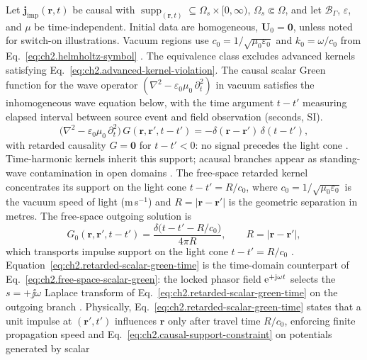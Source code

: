 Let $\mathbf{j}_{\mathrm{imp}}(\mathbf{r},t)$ be causal with
\(\operatorname{supp}_{(\mathbf{r},t)}\subseteq\Omega_s\times[0,\infty)\),
\(\Omega_s\Subset\Omega\), and let \(\mathcal{B}_\Gamma\), \(\varepsilon\), and
\(\mu\) be time-independent. Initial data are homogeneous,
\(\mathbf{U}_0=\mathbf{0}\), unless noted for switch-on illustrations. Vacuum
regions use \(c_0=1/\sqrt{\mu_0\varepsilon_0}\) and \(k_0=\omega/c_0\) from
Eq.~\eqref{eq:ch2.helmholtz-symbol} \cite{stratton1941}. The equivalence class
excludes advanced kernels satisfying Eq.~\eqref{eq:ch2.advanced-kernel-violation}.
The causal scalar Green function for the wave operator
\((\nabla^{2}-\varepsilon_0\mu_0\,\partial_t^{2})\) in vacuum satisfies the
inhomogeneous wave equation below, with the time argument \(t-t'\) measuring elapsed
interval between source event and field observation (seconds, SI).
\begin{equation}
\label{eq:ch2.retarded-scalar-wave-operator}
\Big(\nabla^{2}-\varepsilon_0\mu_0\,\partial_t^{2}\Big)\,
G(\mathbf{r},\mathbf{r}',t-t')
=
-\delta(\mathbf{r}-\mathbf{r}')\,\delta(t-t'),
\end{equation}
with retarded causality $G=\mathbf{0}$ for $t-t'<0$: no signal precedes the light cone
\cite{stratton1941}. Time-harmonic kernels inherit this support; acausal branches appear
as standing-wave contamination in open domains \cite{harrington2001}.
The free-space retarded kernel concentrates its support on the light cone
\(t-t'=R/c_0\), where \(c_0=1/\sqrt{\mu_0\varepsilon_0}\) is the vacuum speed of light
(m\,s\(^{-1}\)) and \(R=|\mathbf{r}-\mathbf{r}'|\) is the geometric separation in metres.
The free-space outgoing solution is
\begin{equation}
\label{eq:ch2.retarded-scalar-green-time}
G_0(\mathbf{r},\mathbf{r}',t-t')
=
\frac{\delta\!\big(t-t'-R/c_0\big)}{4\pi R},
\qquad
R=|\mathbf{r}-\mathbf{r}'|,
\end{equation}
which transports impulse support on the light cone \(t-t'=R/c_0\)
\cite{stratton1941}. Equation~\eqref{eq:ch2.retarded-scalar-green-time} is the
time-domain counterpart of Eq.~\eqref{eq:ch2.free-space-scalar-green}: the locked
phasor field $\mathrm{e}^{+\mathrm{j}\omega t}$ selects the $s=+\jj\omega$ Laplace transform
of Eq.~\eqref{eq:ch2.retarded-scalar-green-time} on the outgoing branch
\cite{harrington2001}. Physically, Eq.~\eqref{eq:ch2.retarded-scalar-green-time}
states that a unit impulse at \((\mathbf{r}',t')\) influences \(\mathbf{r}\) only
after travel time \(R/c_0\), enforcing finite propagation speed and
Eq.~\eqref{eq:ch2.causal-support-constraint} on potentials generated by scalar
